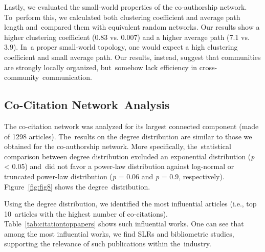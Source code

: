 \documentclass[jmse,review,accept,pdftex,moreauthors]{Definitions/mdpi}
\begin{document}
Lastly, we evaluated the small-world properties of the co-authorship network. To~perform this, we calculated both clustering coefficient and average path length and~compared them with equivalent random networks. Our results show a higher clustering coefficient (0.83 vs. 0.007) and a higher average path (7.1 vs. 3.9). In~a proper small-world topology, one would expect a high clustering coefficient and small average path. Our results, instead, suggest that communities are strongly locally organized, but~somehow lack efficiency in cross-community~communication.

\subsection{Co-Citation Network~Analysis}
The co-citation network was analyzed for its largest connected component (made of 1298 articles). The~results on the degree distribution are similar to those we obtained for the co-authorship network. More specifically, the~statistical comparison between degree distribution excluded an exponential distribution (\emph{p} {\textless} 0.05) and~did not favor a power-law distribution against log-normal or truncated power-law distribution (\emph{p} = 0.06 and \emph{p} = 0.9, respectively). Figure~\ref{fig:fig8} shows the degree~distribution.


Using the degree distribution, we identified the most influential articles (i.e., top 10~articles with the highest number of co-citations). Table~\ref{tab:citationtoppapers} shows such influential works. One can see that among the most influential works, we find SLRs and bibliometric studies, supporting the relevance of such publications within the~industry.
\end{document}

